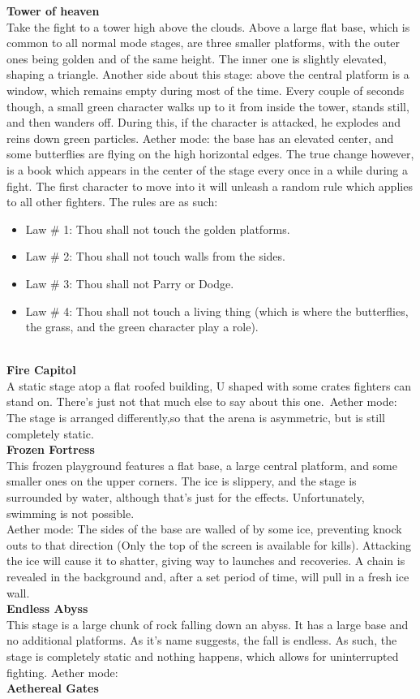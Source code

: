 \documentclass[11pt]{article}
\begin{document}
\textbf{Tower of heaven}\\
Take the fight to a tower high above the clouds. Above a large flat base, which is common to all normal mode stages, are three smaller platforms, with the outer ones being golden and of the same height. The inner one is slightly elevated, shaping a triangle. Another side about this stage: above the central platform is a window, which remains empty during most of the time. Every couple of seconds though, a small green character walks up to it from inside the tower, stands still, and then wanders off. During this, if the character is attacked, he explodes and reins down green particles.
Aether mode: the base has an elevated center, and some butterflies are flying on the high horizontal edges. The true change however, is a book which appears in the center of the stage every once in a while during a fight. The first character to move into it will unleash a random rule which applies to all other fighters. The rules are as such:\\
\begin{itemize}
\item Law # 1: Thou shall not touch the golden platforms.
\item Law # 2: Thou shall not touch walls from the sides.
\item Law # 3: Thou shall not Parry or Dodge.
\item Law # 4: Thou shall not touch a living thing (which is where the butterflies, the grass, and the green character play a role).
\end{itemize}
\\

\textbf{Fire Capitol}\\
A static stage atop a flat roofed building, U shaped with some crates fighters can stand on. There's just not that much else to say about this one.\
Aether mode: The stage is arranged differently,so that the arena is asymmetric, but is still completely static.\\
\textbf{Frozen Fortress}\\
This frozen playground features a flat base, a large central platform, and some smaller ones on the upper corners. The ice is slippery, and the stage is surrounded by water, although that's just for the effects. Unfortunately, swimming is not possible.\\
Aether mode: The sides of the base are walled of by some ice, preventing knock outs to that direction (Only the top of the screen is available for kills). Attacking the ice will cause it to shatter, giving way to launches and recoveries. A chain is revealed in the background and, after a set period of time, will pull in a fresh ice wall.
\\
\textbf{Endless Abyss}\\
This stage is a large chunk of rock falling down an abyss. It has a large base and no additional platforms. As it's name suggests, the fall is endless. As such, the stage is completely static and nothing happens, which allows for uninterrupted fighting.
Aether mode: %
\\
\textbf{Aethereal Gates}\\
\end{document}
